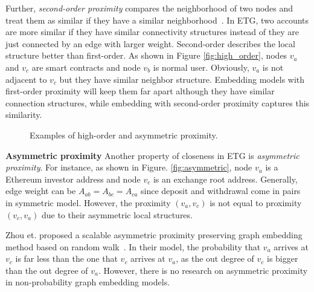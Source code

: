 Further, \emph{second-order proximity} compares the neighborhood of two nodes and treat them as similar if they have a similar neighborhood~\cite{goyal2018graph}. In ETG, two accounts are more similar if they have similar connectivity structures instead of they are just connected by an edge with larger weight. Second-order describes the local structure better than first-order. As shown in Figure \ref{fig:high_order}, nodes $v_a$ and $v_c$ are smart contracts and node $v_b$ is normal user. Obviously, $v_a$ is not adjacent to $v_c$  but they have similar neighbor structure. Embedding models with first-order proximity will keep them far apart although they have similar connection structures, while embedding with second-order proximity captures this similarity.


\begin{figure}[htbp]
	\centering
	\caption{Examples of high-order and asymmetric proximity.}

\end{figure}

\textbf{Asymmetric proximity}
Another property of closeness in ETG is \emph{asymmetric proximity}. For instance, as shown in Figure. \ref{fig:asymmetric}, node $v_a$ is a Ethereum investor address and node $v_c$ is an exchange root address. Generally, edge weight can be $A_{ab}=A_{bc}=A_{ca}$ since deposit and withdrawal come in pairs in symmetric model. However, the proximity $(v_a,v_c)$ is not equal to proximity $(v_c,v_a)$ due to their asymmetric local structures.

 Zhou et. proposed a scalable asymmetric proximity preserving graph embedding method based on random walk~\cite{zhou2017scalable}. In their model, the probability that $v_a$ arrives at $v_c$ is far less than the one that $v_c$ arrives at $v_a$, as the out degree of $v_c$ is bigger than the out degree of $v_a$.
However, there is no research on asymmetric proximity in non-probability graph embedding models.




